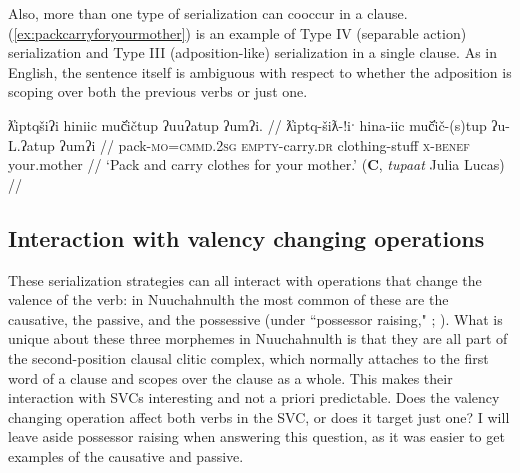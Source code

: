 \begin{comment}
Something similar happened with Sophie Billy. Sentence () is from a translation text she has been working on, and I asked about rephrases () and (). While I was interpreting () as manner and action (Type I), I think she, in the context of the story, saw them as sequential (Type V): lead and then bring back. In this context, the reordering of () is nonsense: One cannot bring someone back and then lead them.

\ex \label{ex:leadbringback}
\begingl
\glpreamble m̓aw̓aaƛint ḥaaw̓iłƛisi huʔacap̓ƛ. //
\gla m̓aw̓aa=!aƛ=int ḥaaw̓iłƛ=ʔis=ʔiˑ huʔa-ci-!ap=!aƛ //
\glb lead=\textsc{now}=\textsc{pst} young.man=\textsc{dim}=\textsc{art} back-go=\textsc{caus}\textsc{now} //
\glft `She led the young man and took him back.' (\textbf{Q}, Sophie Billy) //
\endgl
\xe

NB: This is due to obj-verb ordering of ex. 3
BM
yaacukw̓it̓asaḥ waałak c̓uumaʕas
*yaacukw̓it̓asaḥ c̓uumaʕas
*yaacukw̓it̓asaḥ c̓uumaʕas waałak


NB: This may be due to the !aƛ forcing a two-sentence interpretation
SB
m̓aw̓aaƛint ḥaaw̓iłƛisi huʔacap̓ƛ
m̓aw̓aaƛint huʔacap̓ƛ ḥaaw̓iłƛisi
*huʔacap̓ƛint m̓aw̓aaƛ ḥaaw̓iłƛisi 
\end{comment}

Also, more than one type of serialization can cooccur in a clause. (\ref{ex:packcarryforyourmother}) is an example of Type IV (separable action) serialization and Type III (adposition-like) serialization in a single clause. As in English, the sentence itself is ambiguous with respect to whether the adposition is scoping over both the previous verbs or just one.

\ex \label{ex:packcarryforyourmother}
\begingl
\glpreamble ƛ̓iptqšiʔi hiniic muč̓ičtup ʔuuʔatup ʔumʔi. //
\gla ƛ̓iptq-šiƛ-!iˑ hina-iic muč̓ič-(s)tup ʔu-L.ʔatup ʔumʔi //
\glb pack-\textsc{mo}=\textsc{cmmd.2sg} \textsc{empty}-carry.\textsc{dr} clothing-stuff \textsc{x}-\textsc{benef} your.mother //
\glft `Pack and carry clothes for your mother.' (\textbf{C}, \textit{tupaat} Julia Lucas) //
\endgl
\xe

\subsection{Interaction with valency changing operations} \label{ch:sv:valence}

These serialization strategies can all interact with operations that change the valence of the verb: in Nuuchahnulth the most common of these are the causative, the passive, and the possessive (under ``possessor raising," \citealt[p.~307--309]{davidson2002}; \citealt{braithwaite2003}). What is unique about these three morphemes in Nuuchahnulth is that they are all part of the second-position clausal clitic complex, which normally attaches to the first word of a clause and scopes over the clause as a whole. This makes their interaction with SVCs interesting and not a priori predictable. Does the valency changing operation affect both verbs in the SVC, or does it target just one? I will leave aside possessor raising when answering this question, as it was easier to get examples of the causative and passive.

